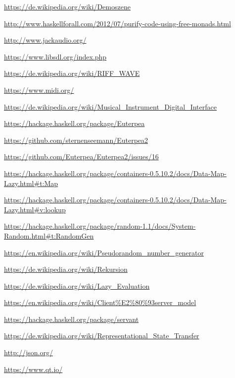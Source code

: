 \documentclass[a4paper,twocolumn]{article}
\begin{document}

\begin{thebibliography}{9}
  \url{https://de.wikipedia.org/wiki/Demoszene}

  \url{http://www.haskellforall.com/2012/07/purify-code-using-free-monads.html}

  \url{http://www.jackaudio.org/}

  \url{https://www.libsdl.org/index.php}

  \url{https://de.wikipedia.org/wiki/RIFF_WAVE}

  \url{https://www.midi.org/}

  \url{https://de.wikipedia.org/wiki/Musical_Instrument_Digital_Interface}

  \url{https://hackage.haskell.org/package/Euterpea}

  \url{https://github.com/sternenseemann/Euterpea2}

  \url{https://github.com/Euterpea/Euterpea2/issues/16}

  \url{https://hackage.haskell.org/package/containers-0.5.10.2/docs/Data-Map-Lazy.html#t:Map}

  \url{https://hackage.haskell.org/package/containers-0.5.10.2/docs/Data-Map-Lazy.html#v:lookup}

  \url{https://hackage.haskell.org/package/random-1.1/docs/System-Random.html#t:RandomGen}

  \url{https://en.wikipedia.org/wiki/Pseudorandom_number_generator}

  \url{https://de.wikipedia.org/wiki/Rekursion}

  \url{https://de.wikipedia.org/wiki/Lazy_Evaluation}

  \url{https://en.wikipedia.org/wiki/Client%E2%80%93server_model}

  \url{https://hackage.haskell.org/package/servant}

  \url{https://de.wikipedia.org/wiki/Representational_State_Transfer}

  \url{http://json.org/}

  \url{https://www.qt.io/}


\end{thebibliography}
\end{document}
